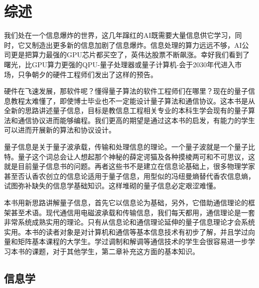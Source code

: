 \documentclass{ctexbook}
\begin{document}




\setcounter{tocdepth}{3}
\tableofcontents

\mainmatter

\chapter{综述}\label{c-intro}
我们处在一个信息爆炸的世界，这几年蹿红的AI既需要大量信息供它学习，同时，它又制造出更多新的信息加剧了信息爆炸。信息处理的算力远远不够，AI公司更是把算力最强的GPU芯片都买空了，英伟达股票不断飙涨。幸好我们看到了曙光，比GPU算力更强的QPU-量子处理器或量子计算机-会于2030年代进入市场，只争朝夕的硬件工程师们发出了这样的预告。

硬件在飞速发展，那软件呢？懂得量子算法的软件工程师们在哪里？现在的量子信息教程太难懂了，即使博士毕业也不一定能设计量子算法和通信协议。这本书是从全新的思路讲述量子信息，目标是教信息工程相关专业的本科生学会现有的量子算法和通信协议进而能够编程。我们更高的期望是通过这本书的启发，有能力的学生可以进而开展新的算法和协议设计。

量子信息是关于量子波承载，传输和处理信息的理论。一个量子波就是一个量子比特。量子这个词总会让人想起那个神秘的薛定谔猫及各种摸棱两可和不可思议，这就是目前量子信息书的问题。再者这些书不是建立在信息论基础上，很多物理学家甚至否认香农创立的信息论适用于量子信息，用型似的冯纽曼熵替代香农信息熵，试图弥补缺失的信息学基础知识。这样堆砌的量子信息必定艰涩难懂。

本书用新思路讲解量子信息，首先它以信息论为基础，另外，它借助通信理论的框架甚至术语。现代通信用电磁波承载和传输信息，我们每天都用，通信理论是一套非常系统成熟实用的理论。只有从信息论和通信理论延伸的量子信息理论才会系统实用。本书的读者对象是对计算机和通信等基本信息技术有初步了解，并且学过向量和矩阵基本课程的大学生。学过调制和解调等通信技术的学生会很容易进一步学习本书的课题，对于其他学生，第二章补充这方面的基本知识。

\section{信息学}
\end{document}
